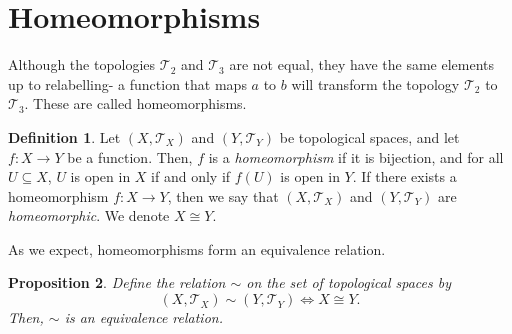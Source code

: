 \documentclass[a4paper, openany]{memoir}
\theoremstyle{definition}
\newtheorem{definition}{Definition}[section]
\theoremstyle{plain}
\newtheorem{proposition}[definition]{Proposition}
\begin{document}
\section{Homeomorphisms}
Although the topologies $\mathcal{T}_2$ and $\mathcal{T}_3$ are not equal, they have the same elements up to relabelling- a function that maps $a$ to $b$ will transform the topology $\mathcal{T}_2$ to $\mathcal{T}_3$. These are called homeomorphisms.
\begin{definition}
Let $(X, \mathcal{T}_X)$ and $(Y, \mathcal{T}_Y)$ be topological spaces, and let $f: X \to Y$ be a function. Then, $f$ is a \emph{homeomorphism} if  it is bijection, and for all $U \subseteq X$, $U$ is open in $X$ if and only if $f(U)$ is open in $Y$. If there exists a homeomorphism $f: X \to Y$, then we say that $(X, \mathcal{T}_X)$ and $(Y, \mathcal{T}_Y)$ are \emph{homeomorphic}. We denote $X \cong Y$.
\end{definition}
\noindent As we expect, homeomorphisms form an equivalence relation.
\begin{proposition}
Define the relation $\sim$ on the set of topological spaces by
\[(X, \mathcal{T}_X) \sim (Y, \mathcal{T}_Y) \iff X \cong Y.\]
Then, $\sim$ is an equivalence relation.
\end{proposition}
\end{document}
